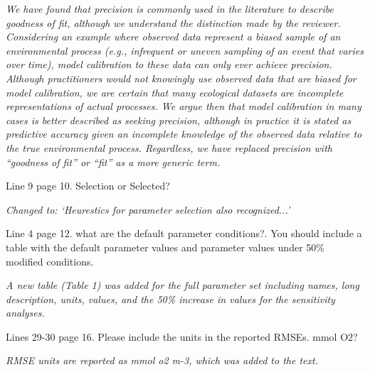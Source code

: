 \documentclass[letterpaper,12pt]{article}\usepackage[]{graphicx}\usepackage[]{color}
\begin{document}
{\it We have found that precision is commonly used in the literature to describe goodness of fit, although we understand the distinction made by the reviewer.  Considering an example where observed data represent a biased sample of an environmental process (e.g., infrequent or uneven sampling of an event that varies over time), model calibration to these data can only ever achieve precision.  Although practitioners would not knowingly use observed data that are biased for model calibration, we are certain that many ecological datasets are incomplete representations of actual processes.  We argue then that model calibration in many cases is better described as seeking precision, although in practice it is stated as predictive accuracy given an incomplete knowledge of the observed data relative to the true environmental process. Regardless, we have replaced precision with ``goodness of fit'' or ``fit'' as a more generic term.}

Line 9 page 10. Selection or Selected?

{\it Changed to: `Heurestics for parameter selection also recognized...'}

Line 4 page 12. what are the default parameter conditions?. You should include a table with the default parameter values and parameter values under 50\% modified conditions. 

{\it A new table (Table 1) was added for the full parameter set including names, long description, units, values, and the 50\% increase in values for the sensitivity analyses.}

Lines 29-30 page 16. Please include the units in the reported RMSEs. mmol O2?

{\it RMSE units are reported as mmol o2 m-3, which was added to the text.}
\end{document}
